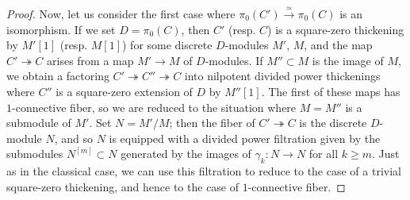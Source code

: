\documentclass[10pt]{amsart}
\begin{document}
\begin{proof}
Now, let us consider the first case where $\pi_0(C')\xrightarrow{\simeq}\pi_0(C)$ is an isomorphism. If we set $D = \pi_0(C)$, then $C'$ (resp. $C$) is a square-zero thickening by $M'[1]$ (resp. $M[1]$) for some discrete $D$-modules $M'$, $M$, and the map $C'\twoheadrightarrow C$ arises from a map $M'\to M$ of $D$-modules. If $M''\subset M$ is the image of $M$, we obtain a factoring $C'\twoheadrightarrow C''\twoheadrightarrow C$ into nilpotent divided power thickenings where $C''$ is a square-zero extension of $D$ by $M''[1]$. The first of these maps has $1$-connective fiber, so we are reduced to the situation where $M = M''$ is a submodule of $M'$. Set $N= M'/M$; then the fiber of $C'\twoheadrightarrow C$ is the discrete $D$-module $N$, and so $N$ is equipped with a divided power filtration given by the submodules $N^{[m]}\subset N$ generated by the images of $\gamma_k:N\to N$ for all $k\ge m$. Just as in the classical case, we can use this filtration to reduce to the case of a trivial square-zero thickening, and hence to the case of $1$-connective fiber.
\end{proof}
\end{document}
